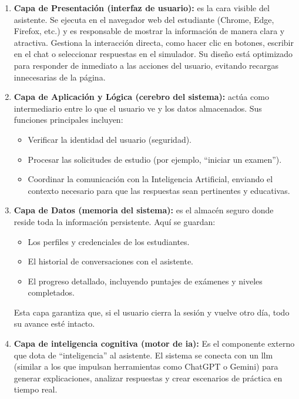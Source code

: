 \begin{enumerate}
\item \textbf{Capa de Presentación (interfaz de usuario):}
    es la cara visible del asistente. Se ejecuta en el navegador web del estudiante (Chrome, Edge, Firefox, etc.) y es responsable de mostrar la información de manera clara y atractiva. Gestiona la interacción directa, como hacer clic en botones, escribir en el chat o seleccionar respuestas en el simulador. Su diseño está optimizado para responder de inmediato a las acciones del usuario, evitando recargas innecesarias de la página.

\item \textbf{Capa de Aplicación y Lógica (cerebro del sistema):}
    actúa como intermediario entre lo que el usuario ve y los datos almacenados. Sus funciones principales incluyen:
    \begin{itemize}
    \item Verificar la identidad del usuario (seguridad).
    \item Procesar las solicitudes de estudio (por ejemplo, \enquote{iniciar un examen}).
    \item Coordinar la comunicación con la Inteligencia Artificial, enviando el contexto necesario para que las respuestas sean pertinentes y educativas.
    \end{itemize}

\item \textbf{Capa de Datos (memoria del sistema):}
    es el almacén seguro donde reside toda la información persistente. Aquí se guardan:
    \begin{itemize}
    \item Los perfiles y credenciales de los estudiantes.
    \item El historial de conversaciones con el asistente.
    \item El progreso detallado, incluyendo puntajes de exámenes y niveles completados.
    \end{itemize}
    Esta capa garantiza que, si el usuario cierra la sesión y vuelve otro día, todo su avance esté intacto.

\item \textbf{Capa de inteligencia cognitiva (motor de \gls{ia}):}
    Es el componente externo que dota de ``inteligencia'' al asistente. El sistema se conecta con un \gls{llm} (similar a los que impulsan herramientas como ChatGPT o Gemini) para generar explicaciones, analizar respuestas y crear escenarios de práctica en tiempo real.
\end{enumerate}

